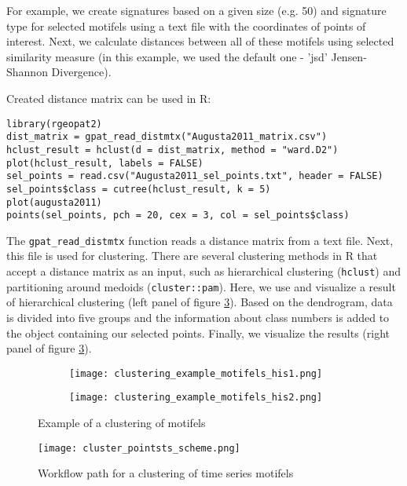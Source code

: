 For example, we create signatures based on a given size (e.g. 50) and signature type for selected motifels using a text file with the coordinates of points of interest.
Next, we calculate distances between all of these motifels using selected similarity measure (in this example, we used the default one - 'jsd' Jensen-Shannon Divergence).

Created distance matrix can be used in R:

\begin{minipage}{\linewidth}
\begin{lstlisting}
library(rgeopat2)
dist_matrix = gpat_read_distmtx("Augusta2011_matrix.csv")
hclust_result = hclust(d = dist_matrix, method = "ward.D2")
plot(hclust_result, labels = FALSE)
sel_points = read.csv("Augusta2011_sel_points.txt", header = FALSE) 
sel_points$class = cutree(hclust_result, k = 5)
plot(augusta2011)
points(sel_points, pch = 20, cex = 3, col = sel_points$class)
\end{lstlisting}
\end{minipage}

The {\tt gpat\_read\_distmtx} function reads a distance matrix from a text file. 
Next, this file is used for clustering. 
There are several clustering methods in R that accept a distance matrix as an input, such as hierarchical clustering ({\tt hclust}) and partitioning around medoids ({\tt cluster::pam}).
Here, we use and visualize a result of hierarchical clustering (left panel of figure \ref{FIG:CLUSTER_POINTS2}).
Based on the dendrogram, data is divided into five groups and the information about class numbers is added to the object containing our selected points.
Finally, we visualize the results (right panel of figure \ref{FIG:CLUSTER_POINTS2}).

\begin{figure}[H]
  \begin{subfigure}[b]{0.5\textwidth}
    \texttt{[image: clustering\_example\_motifels\_his1.png]}
    \label{FIG:CLUSTER_POINTS2a}
  \end{subfigure}
  \begin{subfigure}[b]{0.5\textwidth}
    \texttt{[image: clustering\_example\_motifels\_his2.png]}
    \label{FIG:CLUSTER_POINTS2b}
  \end{subfigure}
  \caption{Example of a clustering of motifels}
  \label{FIG:CLUSTER_POINTS2}
\end{figure}

\begin{figure}[H]
	\centering
	\texttt{[image: cluster\_pointsts\_scheme.png]}
	\caption{Workflow path for a clustering of time series motifels}
	\label{FIG:CLUSTER_POINTSTS}
\end{figure}

